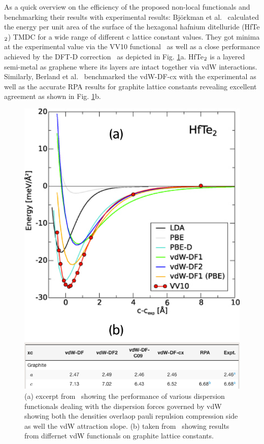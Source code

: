 As a quick overview on the efficiency of the proposed non-local functionals and benchmarking their results with experimental results: Björkman et al.~\cite{Bjorkman2012areWeReady} calculated the energy per unit area of the surface of the hexagonal hafnium ditelluride (HfTe$_{\textrm 2}$) TMDC for a wide range of different c lattice constant values. They got minima at the experimental value via the VV10 functional~\cite{Oleg2010} as well as a close performance achieved by the DFT-D correction~\cite{Grimme2006} as depicted in Fig. \ref{fig:vdWcomparison}a. HfTe$_{\textrm 2}$ is a layered semi-metal as graphene where its layers are intact together via vdW interactions. Similarly, Berland et al.~\cite{Berland2014vdWxc} benchmarked the vdW-DF-cx with the experimental as well as the accurate RPA results for graphite lattice constants revealing excellent agreement as shown in Fig. \ref{fig:vdWcomparison}b. 
\begin{figure}
    \centering
    \includegraphics[scale=1.0,keepaspectratio]{Figs/vdWcomparison.png}
    \caption{(a) excerpt from~\cite{Bjorkman2012areWeReady} showing the performance of various dispersion functionals dealing with the dispersion forces governed by vdW showing both the densities overlaop pauli repulsion compression side as well the vdW attraction slope. (b) taken from~\cite{Berland2014vdWxc} showing results from differnet vdW functionals on graphite lattice constants.}
    \label{fig:vdWcomparison}
\end{figure}
